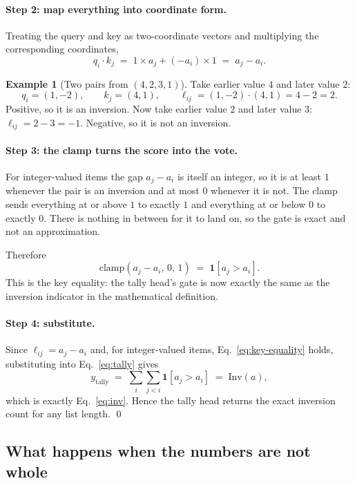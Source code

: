 \documentclass[10pt]{article}
\theoremstyle{definition}
\newtheorem{example}{Example}
\newcommand{\Inv}{\mathrm{Inv}}
\newcommand{\clampf}{\mathrm{clamp}}
\begin{document}
\paragraph{Step 2: map everything into coordinate form.}
Treating the query and key as two-coordinate vectors and multiplying the
corresponding coordinates,
\[
q_i \cdot k_j \;=\; 1 \times a_j + (-a_i) \times 1 \;=\; a_j - a_i .
\]

\begin{example}[Two pairs from $(4,2,3,1)$]
\label{ex:qk}
Take earlier value $4$ and later value $2$:
\[
q_i = (1, -2), \qquad k_j = (4, 1), \qquad
\ell_{ij} = (1,-2)\cdot(4,1) = 4 - 2 = 2 .
\]
Positive, so it is an inversion. Now take earlier value $2$ and later
value $3$: $\ell_{ij} = 2 - 3 = -1$. Negative, so it is not an inversion.
\end{example}

\paragraph{Step 3: the clamp turns the score into the vote.}

For integer-valued items the gap $a_j - a_i$ is itself an integer, so it is
at least $1$ whenever the pair is an inversion and at most $0$ whenever it
is not. The clamp sends everything at or above $1$ to exactly $1$ and
everything at or below $0$ to exactly $0$. There is nothing in between for
it to land on, so the gate is exact and not an approximation.

\noindent Therefore
\begin{equation}
\clampf(a_j - a_i,\, 0,\, 1) \;=\; \mathbf{1}[a_j > a_i].
\label{eq:key-equality}
\end{equation}
This is the key equality: the tally head's gate is now exactly the same as
the inversion indicator in the mathematical definition.

\paragraph{Step 4: substitute.}
Since $\ell_{ij} = a_j - a_i$ and, for integer-valued items,
Eq.~\eqref{eq:key-equality} holds, substituting into
Eq.~\eqref{eq:tally} gives
\[
y_{\text{tally}} \;=\; \sum_i \sum_{j<i} \mathbf{1}[a_j > a_i]
\;=\; \Inv(a),
\]
which is exactly Eq.~\eqref{eq:inv}. Hence the tally head returns the
exact inversion count for any list length. \qed

\subsection{What happens when the numbers are not whole}
\label{sec:gamma}
\end{document}
